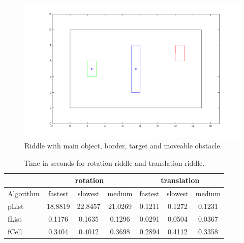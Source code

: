 \begin{figure}[H]
\includegraphics[scale = 0.5]{rotRiddle.png}
\centering
\caption{Riddle with main object, border, target and moveable obstacle.}
\end{figure}
\begin{table}[H]
\centering
\begin{tabular}{l||c|c|c||c|c|c}
& \multicolumn{3}{c||}{rotation} &\multicolumn{3}{c}{translation}\\\hline\hline
Algorithm& fastest & slowest & medium & fastest & slowest & medium\\\hline
pList &  18.8819 & 22.8457  & 21.0269 &  0.1211& 0.1272  & 0.1231\\
fList  & 0.1176&0.1635  &0.1296  & 0.0291 & 0.0504 & 0.0367 \\
fCell & 0.3404 & 0.4012 & 0.3698 & 0.2894 & 0.4112 & 0.3358 \\
\end{tabular}
\caption{Time in seconds for rotation riddle and translation riddle.}
\end{table}

